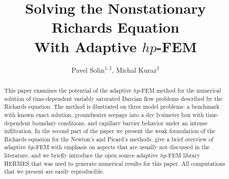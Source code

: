 \documentclass[final,3p,times,twocolumn]{elsarticle}
\begin{document}
\begin{frontmatter}



\title{Solving the Nonstationary Richards Equation\\
       With Adaptive $hp$-FEM}


\author{Pavel Solin$^{1,2}$, Michal Kuraz$^3$}

\address{${}^1$Department of Mathematics and Statistics, University of Nevada, Reno, USA}
\address{${}^2$Institute of Themomechanics, Prague, Czech Republic}
\address{${}^3$Department of Water Resources and Environmental Modeling, Czech University of Life Sciences, Prague, Czech Republic}

\begin{abstract}
This paper examines the potential of the adaptive $hp$-FEM method for the 
numerical solution of time-dependent variably saturated 
Darcian flow problems described by the Richards equation. The method is 
illustrated on three model problems: a benchmark with known exact solution, 
groundwater seepage into a dry lysimeter box with time-dependent boundary 
conditions, and capillary barrier behavior under an intense infiltration. 
In the second part of the paper we present the weak formulation of the Richards equation 
for the Newton's and Picard's methods, give a brief overview of adaptive 
$hp$-FEM with emphasis on aspects that are usually not discussed in the 
literature, and we briefly introduce the open source adaptive $hp$-FEM library 
HERMES that was used to generate numerical results for this paper. All 
computations that we present are easily reproducible.
\end{abstract}


\end{frontmatter}
\end{document}
